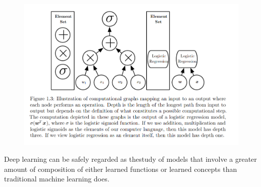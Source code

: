 \documentclass[../Main.tex]{subfiles}
\begin{document}
\begin{figure}[H]
    \centering
    \includegraphics[width=0.75\linewidth]{Images/computational-depth.png}
\end{figure}

Deep learning can be safely regarded as thestudy of models that involve a greater amount of composition 
of either learned functions or learned concepts than traditional machine learning does.
\end{document}
